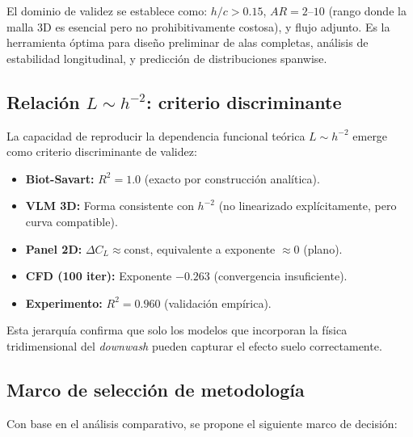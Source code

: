 \documentclass[twocolumn]{article}
\begin{document}
El dominio de validez se establece como: $h/c > 0.15$, $AR = 2$--$10$ (rango donde la malla 3D es esencial pero no prohibitivamente costosa), y flujo adjunto. Es la herramienta óptima para diseño preliminar de alas completas, análisis de estabilidad longitudinal, y predicción de distribuciones spanwise.

\subsection{Relación $L \sim h^{-2}$: criterio discriminante}

La capacidad de reproducir la dependencia funcional teórica $L \sim h^{-2}$ emerge como criterio discriminante de validez:

\begin{itemize}
    \item \textbf{Biot-Savart:} $R^2 = 1.0$ (exacto por construcción analítica).
    \item \textbf{VLM 3D:} Forma consistente con $h^{-2}$ (no linearizado explícitamente, pero curva compatible).
    \item \textbf{Panel 2D:} $\Delta C_L \approx \text{const}$, equivalente a exponente $\approx 0$ (plano).
    \item \textbf{CFD (100 iter):} Exponente $-0.263$ (convergencia insuficiente).
    \item \textbf{Experimento:} $R^2 = 0.960$ (validación empírica).
\end{itemize}

Esta jerarquía confirma que solo los modelos que incorporan la física tridimensional del \textit{downwash} pueden capturar el efecto suelo correctamente.

\subsection{Marco de selección de metodología}

Con base en el análisis comparativo, se propone el siguiente marco de decisión:
\end{document}
